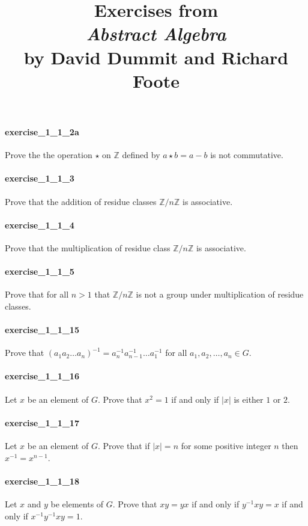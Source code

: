 \documentclass{article}
\title{\textbf{
Exercises from \\
\textit{Abstract Algebra} \\
by David Dummit and Richard Foote
}}
\date{}
\begin{document}
\maketitle

\paragraph{exercise\_1\_1\_2a} Prove the the operation $\star$ on $\mathbb{Z}$ defined by $a\star b=a-b$ is not commutative.

\paragraph{exercise\_1\_1\_3} Prove that the addition of residue classes $\mathbb{Z}/n\mathbb{Z}$ is associative.

\paragraph{exercise\_1\_1\_4} Prove that the multiplication of residue class $\mathbb{Z}/n\mathbb{Z}$ is associative.

\paragraph{exercise\_1\_1\_5} Prove that for all $n>1$ that $\mathbb{Z}/n\mathbb{Z}$ is not a group under multiplication of residue classes.

\paragraph{exercise\_1\_1\_15} Prove that $(a_1a_2\dots a_n)^{-1} = a_n^{-1}a_{n-1}^{-1}\dots a_1^{-1}$ for all $a_1, a_2, \dots, a_n\in G$.

\paragraph{exercise\_1\_1\_16} Let $x$ be an element of $G$. Prove that $x^2=1$ if and only if $|x|$ is either $1$ or $2$.

\paragraph{exercise\_1\_1\_17} Let $x$ be an element of $G$. Prove that if $|x|=n$ for some positive integer $n$ then $x^{-1}=x^{n-1}$.

\paragraph{exercise\_1\_1\_18} Let $x$ and $y$ be elements of $G$. Prove that $xy=yx$ if and only if $y^{-1}xy=x$ if and only if $x^{-1}y^{-1}xy=1$.
\end{document}
